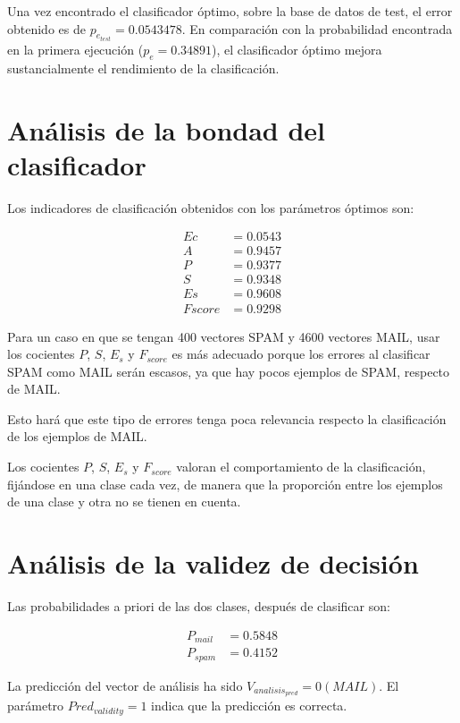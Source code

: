 \documentclass[11pt]{article} %
\begin{document}


Una vez encontrado el clasificador óptimo, sobre la base de datos de test, el error obtenido es de $p_{e_{test}} = 0.0543478$. En comparación con la probabilidad encontrada en la primera ejecución ($p_e = 0.34891$), el clasificador óptimo mejora sustancialmente el rendimiento de la clasificación.

\section{Análisis de la bondad del clasificador}

Los indicadores de clasificación obtenidos con los parámetros óptimos son:

\begin{align}
	Ec &= 0.0543 \\
	A &= 0.9457 \\
	P &= 0.9377 \\
	S &= 0.9348 \\
	Es &= 0.9608 \\
	Fscore &= 0.9298
\end{align}

Para un caso en que se tengan 400 vectores SPAM y 4600 vectores MAIL, usar los cocientes $P$, $S$, $E_s$ y $F_{score}$ es más adecuado porque los errores al clasificar SPAM como MAIL serán escasos, ya que hay pocos ejemplos de SPAM, respecto de MAIL.

Esto hará que este tipo de errores tenga poca relevancia respecto la clasificación de los ejemplos de MAIL.

Los cocientes $P$, $S$, $E_s$ y $F_{score}$ valoran el comportamiento de la clasificación, fijándose en una clase cada vez, de manera que la proporción entre los ejemplos de una clase y otra no se tienen en cuenta.

\section{Análisis de la validez de decisión}

Las probabilidades a priori de las dos clases, después de clasificar son:

\begin{align}
	P_{mail} &= 0.5848 \\
	P_{spam} &= 0.4152
\end{align}


La predicción del vector de análisis ha sido $V_{analisis_{pred}} = 0 (MAIL)$. El parámetro $Pred_{validity} = 1$ indica que la predicción es correcta.
\end{document}
